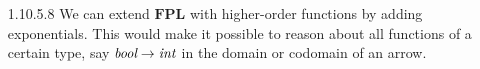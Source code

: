 \documentclass{article}
\newcommand{\fpl}{\mathbf{FPL}}
\begin{document}
\begin{enumerate}
  
\item [1.10.5.8]
  We can extend $\fpl$ with higher-order functions by adding exponentials.
  This would make it possible to reason about all functions of a certain type, say $\emph{bool} \rightarrow \emph{int}$ in the domain or codomain of an arrow.
  
\end{enumerate}
\end{document}
